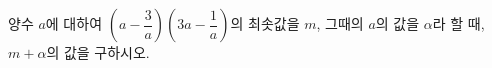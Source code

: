 양수 $a$에 대하여 $\left(a-\dfrac{3}{a}\right)\left(3a-\dfrac{1}{a}\right)$의 최솟값을 $m$, 그때의 $a$의 값을 $\alpha$라 할 때, $m+\alpha$의 값을 구하시오.
